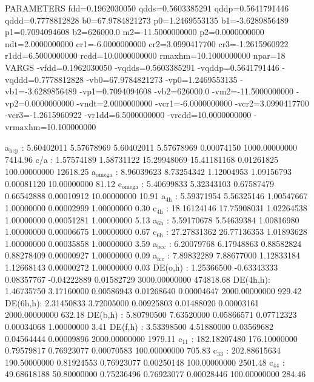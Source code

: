 \documentclass[11pt]{article}
\begin{document}
PARAMETERS
  fdd=0.1962030050 qdds=0.5603385291 qddp=0.5641791446 qddd=0.7778812828 b0=67.9784821273 p0=1.2469553135 b1=-3.6289856489 p1=0.7094094608 b2=626000.0 m2=-11.5000000000 p2=0.0000000000 ndt=2.0000000000 cr1=-6.0000000000 cr2=3.0990417700 cr3=-1.2615960922 r1dd=6.5000000000 rcdd=10.0000000000 rmaxhm=10.1000000000 npar=18 
VARGS
    -vfdd=0.1962030050 -vqdds=0.5603385291 -vqddp=0.5641791446 -vqddd=0.7778812828 -vb0=67.9784821273 -vp0=1.2469553135 -vb1=-3.6289856489 -vp1=0.7094094608 -vb2=626000.0 -vm2=-11.5000000000 -vp2=0.0000000000 -vndt=2.0000000000 -vcr1=-6.0000000000 -vcr2=3.0990417700 -vcr3=-1.2615960922 -vr1dd=6.5000000000 -vrcdd=10.0000000000 -vrmaxhm=10.100000000


a\(_{\text{hcp}}\)   :   5.60402011   5.57678969   5.60402011   5.57678969   0.00074150 1000.00000000      7414.96
c/a     :   1.57574189   1.58731122  15.29948069  15.41181168   0.01261825 100.00000000     12618.25
a\(_{\text{omega}}\) :   8.96039623   8.73254342   1.12004953   1.09156793   0.00081120  10.00000000        81.12
c\(_{\text{omega}}\) :   5.40699833   5.32343103   0.67587479   0.66542888   0.00010912  10.00000000        10.91
a\(_{\text{4h}}\)    :   5.59371954   5.56325146   1.00547667   1.00000000   0.00002999   1.00000000         0.30
c\(_{\text{4h}}\)    :  18.16124146  17.75908031   1.02264538   1.00000000   0.00051281   1.00000000         5.13
a\(_{\text{6h}}\)    :   5.59170678   5.54639384   1.00816980   1.00000000   0.00006675   1.00000000         0.67
c\(_{\text{6h}}\)    :  27.27831362  26.77136353   1.01893628   1.00000000   0.00035858   1.00000000         3.59
a\(_{\text{bcc}}\)   :   6.20079768   6.17948863   0.88582824   0.88278409   0.00000927   1.00000000         0.09
a\(_{\text{fcc}}\)   :   7.89832289   7.88677000   1.12833184   1.12668143   0.00000272   1.00000000         0.03
DE(o,h) :   1.25366500  -0.63343333   0.08357767  -0.04222889   0.01582729 3000.00000000    474818.68
DE(4h,h):   1.46735750   3.17160000   0.00586943   0.01268640   0.00004647 2000.00000000       929.42
DE(6h,h):   2.31450833   3.72005000   0.00925803   0.01488020   0.00003161 2000.00000000       632.18
DE(b,h) :   5.80790500   7.63520000   0.05866571   0.07712323   0.00034068   1.00000000         3.41
DE(f,h) :   3.53398500   4.51880000   0.03569682   0.04564444   0.00009896 2000.00000000      1979.11
c\(_{\text{11}}\)    : 182.18207480 176.10000000   0.79579817   0.76923077   0.00070583 100.00000000       705.83
c\(_{\text{33}}\)    : 202.88615634 190.50000000   0.81924553   0.76923077   0.00250148 100.00000000      2501.48
c\(_{\text{44}}\)    :  49.68618188  50.80000000   0.75236496   0.76923077   0.00028446 100.00000000       284.46
\end{document}
